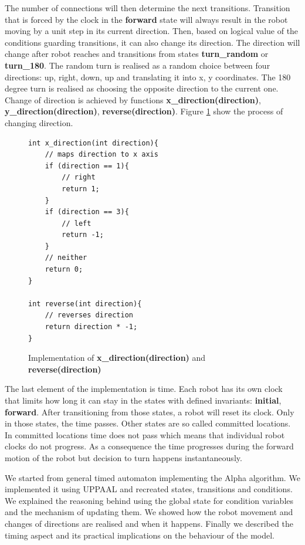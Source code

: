 The number of connections will then determine the next transitions. Transition that is forced by the clock in the \textbf{forward} state will always result in the robot moving by a unit step in its current direction. Then, based on logical value of the conditions guarding transitions, it can also change its direction. The direction will change after robot reaches and transitions from states \textbf{turn\_random} or \textbf{turn\_180}. The random turn is realised as a random choice between four directions: up, right, down, up and translating it into x, y coordinates. The 180 degree turn is realised as choosing the opposite direction to the current one. Change of direction is achieved by functions \textbf{x\_direction(direction)}, \textbf{y\_direction(direction)}, \textbf{reverse(direction)}. Figure \ref{fig:direction} show the process of changing direction.
\begin{figure}[H]
\caption{Implementation of \textbf{x\_direction(direction)} and \textbf{reverse(direction)}}
\lstset { language=C++ }
\begin{lstlisting}
int x_direction(int direction){
    // maps direction to x axis
    if (direction == 1){
        // right
        return 1;
    }
    if (direction == 3){
        // left
        return -1;
    }
    // neither
    return 0;
}

int reverse(int direction){
    // reverses direction
    return direction * -1;
}
\end{lstlisting}
\label{fig:direction}
\end{figure}

The last element of the implementation is time. Each robot has its own clock that limits how long it can stay in the states with defined invariants: \textbf{initial}, \textbf{forward}. After transitioning from those states, a robot will reset its clock. Only in those states, the time passes. Other states are so called committed locations. In committed locations time does not pass which means that individual robot clocks do not progress. As a consequence the time progresses during the forward motion of the robot but decision to turn happens instantaneously.

We started from general timed automaton implementing the Alpha algorithm. We implemented it using UPPAAL and recreated states, transitions and conditions. We explained the reasoning behind using the global state for condition variables and the mechanism of updating them. We showed how the robot movement and changes of directions are realised and when it happens. Finally we described the timing aspect and its practical implications on the behaviour of the model.